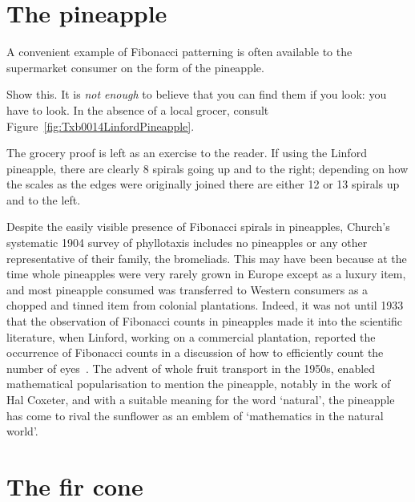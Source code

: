  \section{The pineapple}
A convenient example of Fibonacci patterning is often available to the supermarket consumer on the form of the pineapple.
\begin{exercise}
	\label{ex:doit}
	Show this.  It is \emph{not enough} to believe that you can find them if you look: you have to look. In the absence of a local grocer, consult Figure~\ref{fig:Txb0014LinfordPineapple}.
\end{exercise}
\begin{solution}
	The grocery proof is left as an exercise to the reader. If using the Linford pineapple, there are clearly 8 spirals going up and to the right; depending on how the scales as the edges were originally joined there are either 12 or 13 spirals up and to the left. 
\end{solution} 
Despite the easily visible presence of Fibonacci spirals in pineapples, Church's systematic 1904 survey of phyllotaxis includes no pineapples or any other representative of their family, the bromeliads. This may have been because at the time whole pineapples were very rarely grown in Europe except as a luxury item, and most pineapple consumed was transferred to Western consumers as a chopped and tinned item from colonial plantations. Indeed, it was not until 1933 that the observation of Fibonacci counts in pineapples made it into the scientific literature, when Linford, working on a commercial plantation, reported the occurrence of Fibonacci counts in a discussion of how to efficiently count the number of eyes~\cite{linfordFruitQualityStudies1933}. The advent of whole fruit transport in the 1950s, enabled  mathematical popularisation to mention the pineapple, notably in the work of Hal Coxeter, and with a suitable meaning for the word `natural',  the pineapple has come to rival the sunflower as an emblem of `mathematics in the natural world'.

 \clearpage
\section{The fir cone}

